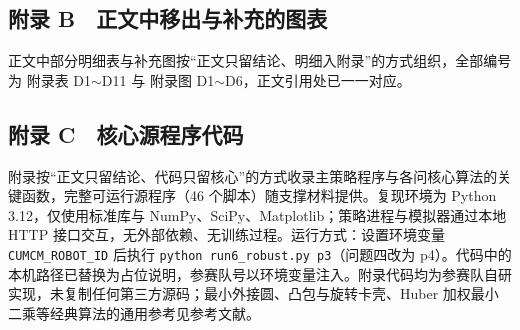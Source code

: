 \begin{table}[htbp]
\centering
\caption*{表 A2　支撑材料中的图件与数据表}
{}
\end{table}

\begin{table}[htbp]
\centering
\caption*{表 A3　行为日志清单（演练按局导出，本文统计样本 34 局；正式测试每问 3 局）}
{}
\end{table}

\subsection*{附录 B　正文中移出与补充的图表}

正文中部分明细表与补充图按“正文只留结论、明细入附录”的方式组织，全部编号为 附录表 D1$\sim$D11 与 附录图 D1$\sim$D6，正文引用处已一一对应。


\FloatBarrier

\subsection*{附录 C　核心源程序代码}

附录按“正文只留结论、代码只留核心”的方式收录主策略程序与各问核心算法的关键函数，完整可运行源程序（46 个脚本）随支撑材料提供。复现环境为 Python 3.12，仅使用标准库与 NumPy、SciPy、Matplotlib；策略进程与模拟器通过本地 HTTP 接口交互，无外部依赖、无训练过程。运行方式：设置环境变量 \texttt{CUMCM\_ROBOT\_ID} 后执行 \texttt{python run6\_robust.py p3}（问题四改为 p4）。代码中的本机路径已替换为占位说明，参赛队号以环境变量注入。附录代码均为参赛队自研实现，未复制任何第三方源码；最小外接圆、凸包与旋转卡壳、Huber 加权最小二乘等经典算法的通用参考见参考文献。

